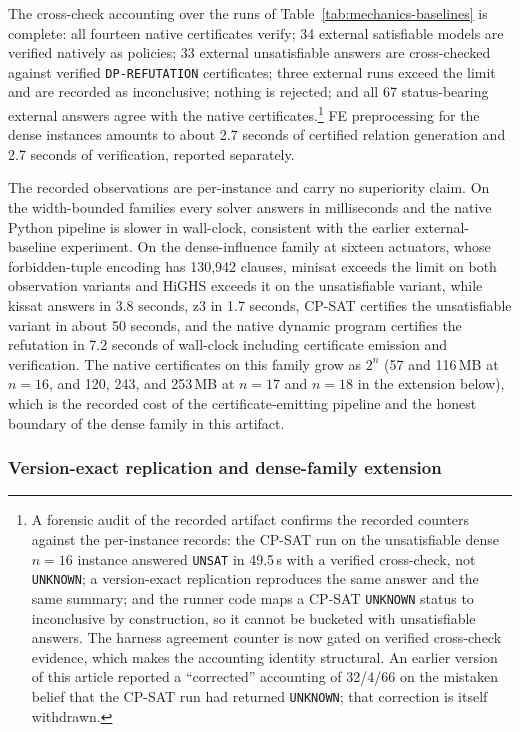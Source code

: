 \documentclass[11pt]{article}
\theoremstyle{plain}
\theoremstyle{definition}
\theoremstyle{remark}
\begin{document}
The cross-check accounting over the runs of
Table~\ref{tab:mechanics-baselines} is complete: all fourteen native certificates
verify; 34 external satisfiable models are verified natively as policies;
33 external unsatisfiable answers are cross-checked against verified
\texttt{DP-REFUTATION} certificates; three external runs exceed the limit
and are recorded as inconclusive; nothing is rejected; and all 67 status-bearing
external answers agree with the native
certificates.\footnote{A forensic audit of the recorded artifact confirms the
recorded counters against the per-instance records: the CP-SAT run on the
unsatisfiable dense \(n{=}16\) instance answered \texttt{UNSAT} in 49.5\,s
with a verified cross-check, not \texttt{UNKNOWN}; a version-exact
replication reproduces the same answer and the same summary; and the
runner code maps a CP-SAT \texttt{UNKNOWN} status to inconclusive by
construction, so it cannot be bucketed with unsatisfiable answers.  The
harness agreement counter is now gated on verified cross-check evidence,
which makes the accounting identity structural.  An earlier version of
this article reported a ``corrected'' accounting of 32/4/66 on the
mistaken belief that the CP-SAT run had returned \texttt{UNKNOWN}; that
correction is itself withdrawn.}
FE preprocessing for the dense instances amounts to about 2.7 seconds of
certified relation generation and 2.7 seconds of verification, reported
separately.

The recorded observations are per-instance and carry no superiority claim.
On the width-bounded families every solver answers in milliseconds and the
native Python pipeline is slower in wall-clock, consistent with the earlier
external-baseline experiment.  On the dense-influence family at sixteen
actuators, whose forbidden-tuple encoding has 130{,}942 clauses, minisat
exceeds the limit on both observation variants and HiGHS exceeds it on the
unsatisfiable variant, while kissat answers in 3.8 seconds, z3 in 1.7
seconds, CP-SAT certifies the unsatisfiable variant in about 50 seconds,
and the native dynamic program certifies the refutation in 7.2 seconds of
wall-clock including certificate emission and verification.  The
native certificates on this family grow as \(2^{n}\) (57 and 116\,MB at
\(n{=}16\), and 120, 243, and 253\,MB at \(n{=}17\) and \(n{=}18\) in
the extension below), which is the recorded cost of the certificate-emitting
pipeline and the honest boundary of the dense family in this artifact.

\subsubsection{Version-exact replication and dense-family extension}
\label{subsubsec:replication-extension}
\end{document}
